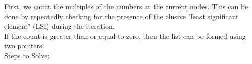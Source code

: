 \documentclass[preview]{standalone}
\begin{document}
First, we count the multiples of the numbers at the current nodes. This can be done by repeatedly checking for the presence of the elusive "least significant element" (LSI) during the iteration.\\If the count is greater than or equal to zero, then the list can be formed using two pointers.\\Steps to Solve:\\
\end{document}

